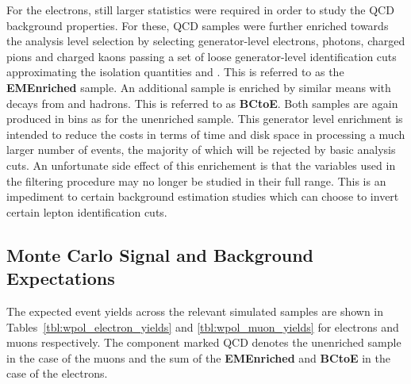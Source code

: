 For the electrons, still larger statistics were required in order to study the
\ac{QCD} background properties. For these, \ac{QCD} samples were further
enriched towards the analysis level selection by selecting generator-level
electrons, photons, charged pions and charged kaons passing a set of loose
generator-level identification cuts approximating the isolation quantities and
\HoverE. This is referred to as the \textbf{EMEnriched} sample. An additional
sample is enriched by similar means with decays from \Pbottom and \Pstrange
hadrons. This is referred to as \textbf{BCtoE}. Both samples are again produced
in \pthat bins as for the unenriched sample. This generator level enrichment is
intended to reduce the costs in terms of time and disk space in processing a
much larger number of events, the majority of which will be rejected by basic
analysis cuts. An unfortunate side effect of this enrichement is that the
variables used in the filtering procedure may no longer be studied in their full
range. This is an impediment to certain background estimation studies which can
choose to invert certain lepton identification cuts.

\subsection{Monte Carlo Signal and Background Expectations}
The expected event yields across the relevant simulated samples are shown in
Tables~\ref{tbl:wpol_electron_yields} and \ref{tbl:wpol_muon_yields} for
electrons and muons respectively. The component marked \ac{QCD} denotes the
unenriched sample in the case of the muons and the sum of the
\textbf{EMEnriched} and \textbf{BCtoE} in the case of the electrons.






